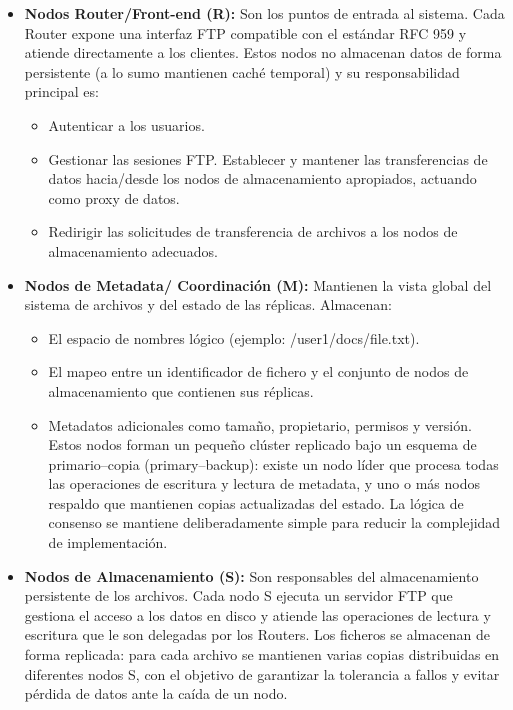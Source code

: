 \documentclass{article}
\begin{document}
\begin{itemize}
    \item \textbf{Nodos Router/Front-end (R):} Son los puntos de entrada al sistema. Cada Router expone una interfaz FTP compatible con el estándar RFC 959 y atiende directamente a los clientes. 
    Estos nodos no almacenan datos de forma persistente (a lo sumo mantienen caché temporal) y su responsabilidad principal es:
    \begin{itemize}
        \item Autenticar a los usuarios.
        \item Gestionar las sesiones FTP. Establecer y mantener las transferencias de datos hacia/desde los nodos de almacenamiento apropiados, actuando como proxy de datos.
        \item Redirigir las solicitudes de transferencia de archivos a los nodos de almacenamiento adecuados.
        \end{itemize}
    \item \textbf{Nodos de Metadata/ Coordinación (M):} Mantienen la vista global del sistema de archivos y del estado de las réplicas. Almacenan:
    \begin{itemize}
        \item El espacio de nombres lógico (ejemplo: /user1/docs/file.txt).
        \item El mapeo entre un identificador de fichero y el conjunto de nodos de almacenamiento que contienen sus réplicas.
        \item Metadatos adicionales como tamaño, propietario, permisos y versión.
Estos nodos forman un pequeño clúster replicado bajo un esquema de primario–copia (primary–backup): existe un nodo líder 
que procesa todas las operaciones de escritura y lectura de metadata, y uno o más nodos respaldo que mantienen copias actualizadas del estado. 
La lógica de consenso se mantiene deliberadamente simple para reducir la complejidad de implementación.
        \end{itemize}
            \item \textbf{Nodos de Almacenamiento (S):} Son responsables del almacenamiento persistente de los archivos. Cada nodo S ejecuta un servidor FTP que gestiona el acceso a los datos en disco y atiende las operaciones de lectura y escritura que le son delegadas por los Routers. 
    Los ficheros se almacenan de forma replicada: 
    para cada archivo se mantienen varias copias distribuidas en diferentes nodos S, con el objetivo de garantizar la tolerancia a fallos y evitar pérdida de datos ante la caída de un nodo.
\end{itemize}
\end{document}
